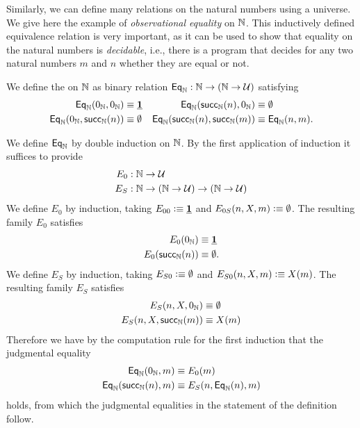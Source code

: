 Similarly, we can define many relations on the natural numbers using a universe. We give here the example of \emph{observational equality} on ${\mathbb{N}}$. This inductively defined equivalence relation is very important, as it can be used to show that equality on the natural numbers is \emph{decidable}, i.e., there is a program that decides for any two natural numbers $m$ and $n$ whether they are equal or not.

\begin{defn}\label{defn:obs_nat}
We define the  on ${\mathbb{N}}$ as binary relation $\mathsf{Eq}_{{\mathbb{N}}}:{\mathbb{N}}\to({\mathbb{N}}\to\mathcal{U})$ satisfying
\begin{align*}
\mathsf{Eq}_{{\mathbb{N}}}(0_{{\mathbb{N}}},0_{{\mathbb{N}}}) & \equiv \underline{\mathbf{1}} & \mathsf{Eq}_{{\mathbb{N}}}(\mathsf{succ}_{{\mathbb{N}}}(n),0_{{\mathbb{N}}}) & \equiv \emptyset \\
\mathsf{Eq}_{{\mathbb{N}}}(0_{{\mathbb{N}}},\mathsf{succ}_{{\mathbb{N}}}(n)) & \equiv \emptyset & \mathsf{Eq}_{{\mathbb{N}}}(\mathsf{succ}_{{\mathbb{N}}}(n),\mathsf{succ}_{{\mathbb{N}}}(m)) & \equiv \mathsf{Eq}_{{\mathbb{N}}}(n,m).
\end{align*}
\end{defn}

\begin{constr}
We define $\mathsf{Eq}_{{\mathbb{N}}}$ by double induction on ${\mathbb{N}}$. By the first application of induction it suffices to provide
\begin{align*}
E_0 & : {\mathbb{N}}\to\mathcal{U} \\
E_S & : {\mathbb{N}}\to ({\mathbb{N}}\to\mathcal{U})\to({\mathbb{N}}\to\mathcal{U})
\end{align*}
We define $E_0$ by induction, taking $E_{00}\vcentcolon\equiv \underline{\mathbf{1}}$ and $E_{0S}(n,X,m)\vcentcolon\equiv \emptyset$. The resulting family $E_0$ satisfies
\begin{align*}
E_0(0_{{\mathbb{N}}}) & \equiv \underline{\mathbf{1}} \\
E_0(\mathsf{succ}_{{\mathbb{N}}}(n)) & \equiv \emptyset.
\end{align*} 
We define $E_S$ by induction, taking $E_{S0}\vcentcolon\equiv \emptyset$ and $E_{S0}(n,X,m)\vcentcolon\equiv X(m)$. The resulting family $E_S$ satisfies
\begin{align*}
E_S(n,X,0_{{\mathbb{N}}}) & \equiv \emptyset \\
E_S(n,X,\mathsf{succ}_{{\mathbb{N}}}(m)) & \equiv X(m) 
\end{align*}
Therefore we have by the computation rule for the first induction that the judgmental equality
\begin{align*}
\mathsf{Eq}_{{\mathbb{N}}}(0_{{\mathbb{N}}},m) & \equiv E_0(m) \\
\mathsf{Eq}_{{\mathbb{N}}}(\mathsf{succ}_{{\mathbb{N}}}(n),m) & \equiv E_S(n,\mathsf{Eq}_{{\mathbb{N}}}(n),m)
\end{align*}
holds, from which the judgmental equalities in the statement of the definition follow.
\end{constr}

